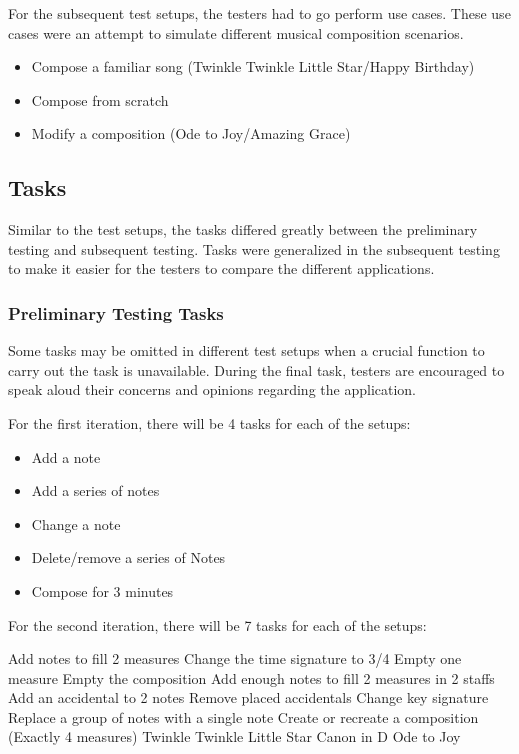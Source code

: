 				For the subsequent test setups, the testers had to go perform use cases. These use cases were an attempt to simulate different musical composition scenarios. 

				\begin{itemize}
				    \item Compose a familiar song (Twinkle Twinkle Little Star/Happy Birthday)
				    \item Compose from scratch
				    \item Modify a composition (Ode to Joy/Amazing Grace)
				\end{itemize}

		\subsection{Tasks}
		\label{sec:tasks}

			Similar to the test setups, the tasks differed greatly between the preliminary testing and subsequent testing. Tasks were generalized in the subsequent testing to make it easier for the testers to compare the different applications.

			\subsubsection{Preliminary Testing Tasks}
			\label{sec:preliminary-tasks}

				Some tasks may be omitted in different test setups when a crucial function to carry out the task is unavailable. During the final task, testers are encouraged to speak aloud their concerns and opinions regarding the application.

				For the first iteration, there will be 4 tasks for each of the setups:
				\begin{itemize}
					\item Add a note
					\item Add a series of notes
					\item Change a note
					\item Delete/remove a series of Notes
					\item Compose for 3 minutes
				\end{itemize}

				For the second iteration, there will be 7 tasks for each of the setups:
				\begin{outline}
					\1 Add notes to fill 2 measures
					\1 Change the time signature to 3/4
					\1 Empty one measure
					\1 Empty the composition
					\1 Add enough notes to fill 2 measures in 2 staffs
					\1 Add an accidental to 2 notes
					\1 Remove placed accidentals 
					\1 Change key signature
					\1 Replace a group of notes with a single note
					\1 Create or recreate a composition (Exactly 4 measures)
						\2 Twinkle Twinkle Little Star
						\2 Canon in D
						\2 Ode to Joy
				\end{outline}


